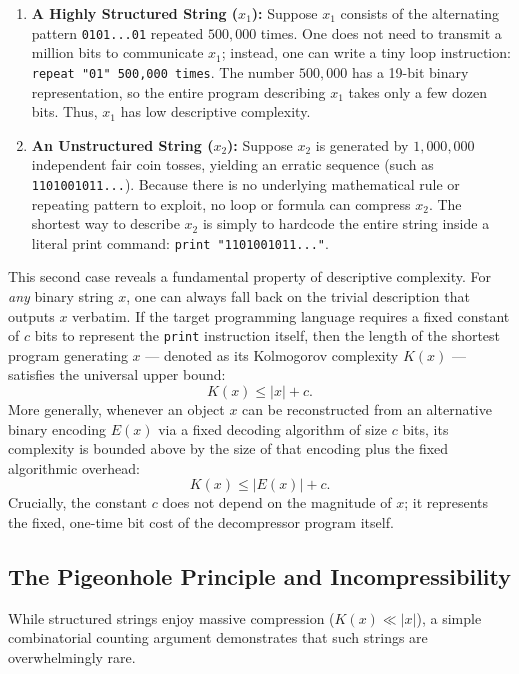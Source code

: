 \documentclass[acmsmall,natbib=false,nonacm]{acmart}
\begin{document}
\begin{enumerate}
    \item \textbf{A Highly Structured String ($x_1$):} Suppose $x_1$ consists of the alternating pattern \texttt{0101...01} repeated $500,000$ times. One does not need to transmit a million bits to communicate $x_1$; instead, one can write a tiny loop instruction: \texttt{repeat "01" 500,000 times}. The number $500,000$ has a 19-bit binary representation, so the entire program describing $x_1$ takes only a few dozen bits. Thus, $x_1$ has low descriptive complexity.
    
    \item \textbf{An Unstructured String ($x_2$):} Suppose $x_2$ is generated by $1,000,000$ independent fair coin tosses, yielding an erratic sequence (such as \texttt{1101001011...}). Because there is no underlying mathematical rule or repeating pattern to exploit, no loop or formula can compress $x_2$. The shortest way to describe $x_2$ is simply to hardcode the entire string inside a literal print command: \texttt{print "1101001011..."}.
\end{enumerate}

This second case reveals a fundamental property of descriptive complexity. For \textit{any} binary string $x$, one can always fall back on the trivial description that outputs $x$ verbatim. If the target programming language requires a fixed constant of $c$ bits to represent the \texttt{print} instruction itself, then the length of the shortest program generating $x$ — denoted as its Kolmogorov complexity $K(x)$ — satisfies the universal upper bound:
\begin{equation}
    K(x) \le |x| + c.
\end{equation}
More generally, whenever an object $x$ can be reconstructed from an alternative binary encoding $E(x)$ via a fixed decoding algorithm of size $c$ bits, its complexity is bounded above by the size of that encoding plus the fixed algorithmic overhead:
\begin{equation}
    \label{eq:decoding_overhead}
    K(x) \le |E(x)| + c.
\end{equation}
Crucially, the constant $c$ does not depend on the magnitude of $x$; it represents the fixed, one-time bit cost of the decompressor program itself.

\subsection{The Pigeonhole Principle and Incompressibility}
While structured strings enjoy massive compression ($K(x) \ll |x|$), a simple combinatorial counting argument demonstrates that such strings are overwhelmingly rare. 
\end{document}
